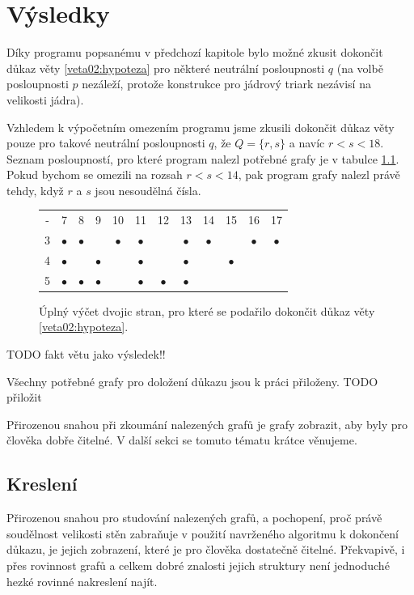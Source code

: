 
\chapter{Výsledky} \label{vysledky}

Díky programu popsanému v předchozí kapitole bylo možné zkusit dokončit důkaz věty \eqref{veta02:hypoteza} pro některé neutrální posloupnosti $q$ (na volbě posloupnosti $p$ nezáleží, protože konstrukce pro jádrový triark nezávisí na velikosti jádra). 

Vzhledem k výpočetním omezením programu jsme zkusili dokončit důkaz věty pouze pro takové neutrální posloupnosti $q$, že $Q = \lbrace r, s\rbrace$ a navíc $r<s<18$. Seznam posloupností, pro které program nalezl potřebné grafy je v tabulce \ref{obr03:tabvysledky}. Pokud bychom se omezili na rozsah $r<s<14$, pak program grafy nalezl právě tehdy, když $r$ a $s$ jsou nesoudělná čísla.

\begin{figure}[h]\centering
\begin{tabular}{ c c c c c c c c c c c c }
  - & 7 & 8 & 9 & 10 & 11 & 12 & 13 & 14 & 15 & 16 & 17 \\
  3 & $\bullet$ & $\bullet$ &  & $\bullet$ & $\bullet$ &  & $\bullet$ & $\bullet$ &  & $\bullet$ & $\bullet$ \\
  4 & $\bullet$ &  & $\bullet$ &  & $\bullet$ &  & $\bullet$ &  & $\bullet$ \\
  5 & $\bullet$ & $\bullet$ & $\bullet$ &  & $\bullet$ & $\bullet$ & $\bullet$  
\end{tabular}
\caption{Úplný výčet dvojic stran, pro které se podařilo dokončit důkaz věty \eqref{veta02:hypoteza}.}
\label{obr03:tabvysledky}
\end{figure}

TODO fakt větu jako výsledek!!

Všechny potřebné grafy pro doložení důkazu jsou k práci přiloženy. TODO přiložit

Přirozenou snahou při zkoumání nalezených grafů je grafy zobrazit, aby byly pro člověka dobře čitelné. V další sekci se tomuto tématu krátce věnujeme. 

\section{Kreslení}

Přirozenou snahou pro studování nalezených grafů, a pochopení, proč právě soudělnost velikosti stěn zabraňuje v použití navrženého algoritmu k dokončení důkazu, je jejich zobrazení, které je pro člověka dostatečně čitelné. Překvapivě, i přes rovinnost grafů a celkem dobré znalosti jejich struktury není jednoduché hezké rovinné nakreslení najít.

